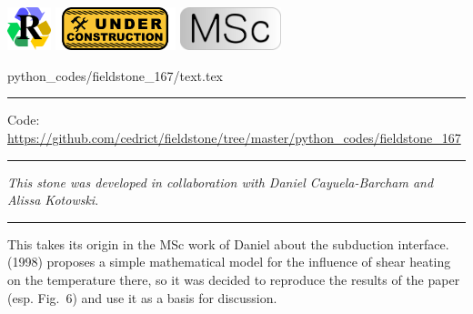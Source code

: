 \noindent
\includegraphics[height=1.25cm]{images/pictograms/replication}
\includegraphics[height=1.25cm]{images/pictograms/under_construction}
\includegraphics[height=1.25cm]{images/pictograms/msc}


\begin{flushright} {\tiny {\color{gray} python\_codes/fieldstone\_167/text.tex}} \end{flushright}

%

\par\noindent\rule{\textwidth}{0.4pt}

\begin{center}
\inpython
{\small Code: \url{https://github.com/cedrict/fieldstone/tree/master/python_codes/fieldstone_167}}
\end{center}

\par\noindent\rule{\textwidth}{0.4pt}

{\sl This stone was developed in collaboration with Daniel Cayuela-Barcham and Alissa Kotowski}. 

\par\noindent\rule{\textwidth}{0.4pt}


This \stone takes its origin in the MSc work of Daniel about the subduction interface. 
\textcite{stuw98} (1998) proposes a simple mathematical model for the influence 
of shear heating on the temperature there, so it was decided to 
reproduce the results of the paper (esp. Fig.~6) and use it as a basis for discussion.


